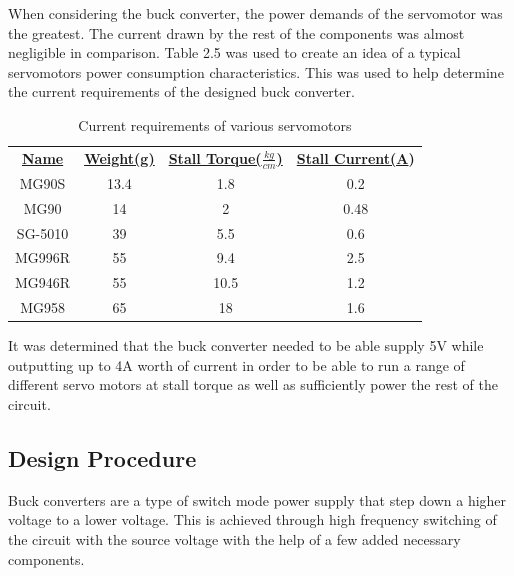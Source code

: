 When considering the buck converter, the power demands of the servomotor was the greatest. The current drawn by the rest of the components was almost negligible in comparison. Table 2.5 was used to create an idea of a typical servomotors power consumption characteristics. This was used to help determine the current requirements of the designed buck converter.
\vspace{2mm}
\begin{table}[H]
        \centering
        \begin{tabular}{|c|c|c|c|}
        \hline
         \textbf{\underline{Name}}  & \textbf{\underline{Weight(g)}}   & \textbf{\underline{Stall Torque($\frac{kg}{cm}$)}} & \textbf{\underline{Stall Current(A})}\\
          MG90S   & 13.4 & 1.8  & 0.2  \\
          MG90    & 14   & 2    & 0.48 \\
          SG-5010 & 39   & 5.5  & 0.6  \\
          MG996R  & 55   & 9.4  & 2.5  \\
          MG946R  & 55   & 10.5 & 1.2  \\
          MG958   & 65   & 18   & 1.6  \\
          \hline
        \end{tabular}
        \caption{Current requirements of various servomotors}
\end{table}
\vspace{-5mm}
It was determined that the buck converter needed to be able supply 5V while outputting up to 4A worth of current in order to be able to run a range of different servo motors at stall torque as well as sufficiently power the rest of the circuit.

\subsection{Design Procedure}
Buck converters are a type of switch mode power supply that step down a higher voltage to a lower voltage. This is achieved through high frequency switching of the circuit with the source voltage with the help of a few added necessary components. 

